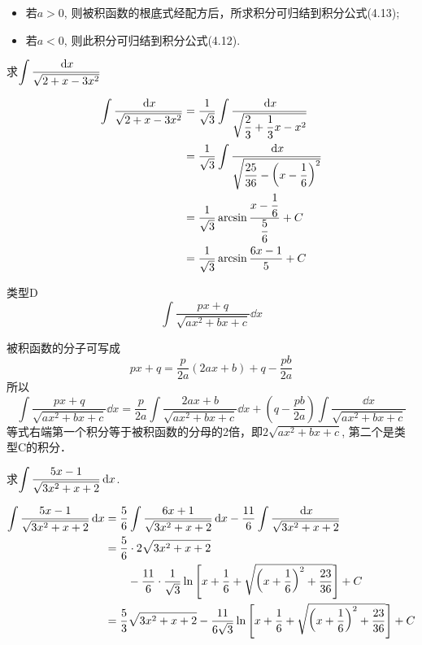 \begin{itemize}
    \item 若$a>0$, 则被积函数的根底式经配方后，所求积分可归结到积分公式(4.13);
    \item  若$a<0$, 则此积分可归结到积分公式(4.12).
\end{itemize}

\begin{example}
    求$\displaystyle\int \dfrac{\,{\rm d} x}{\sqrt{2+x-3x^2}}$
\end{example}

\begin{solution}
    \[\begin{split}
        \displaystyle\int \dfrac{\,{\rm d} x}{\sqrt{2+x-3x^2}}&=\dfrac{1}{\sqrt{3}}\int \dfrac{\,{\rm d} x}{\sqrt{\dfrac{2}{3}+\dfrac{1}{3}x-x^2}}\\
        &=\dfrac{1}{\sqrt{3}}\int \dfrac{\,{\rm d} x}{\sqrt{\dfrac{25}{36}-\left(x-\dfrac{1}{6}\right)^2}}\\
        &=\dfrac{1}{\sqrt{3}}\arcsin\dfrac{x-\dfrac{1}{6}}{\dfrac{5}{6}}+C\\
        &=\dfrac{1}{\sqrt{3}}\arcsin\dfrac{6x-1}{5}+C       
    \end{split}\]
\end{solution}

\begin{blk}{类型D}
\[\int \frac{px+q}{\sqrt{ax^2+bx+c}}\dd x\]
\end{blk}

被积函数的分子可写成
\[px+q=\frac{p}{2a}(2ax+b)+q-\frac{pb}{2a}\]
所以
\[
    \int \frac{px+q}{\sqrt{ax^2+bx+c}}\dd x=\frac{p}{2a}\int \frac{2ax+b}{\sqrt{ax^2+bx+c}}\dd x+\left(q-\frac{pb}{2a}\right)\int\frac{\dd x}{\sqrt{ax^2+bx+c}}
\]
等式右端第一个积分等于被积函数的分母的2倍，即$2\sqrt{ax^2+bx+c}$, 第二个是类型C的积分．

\begin{example}
    求$\displaystyle\int \dfrac{5x-1}{\sqrt{3x^2+x+2}}\,{\rm d} x$.
\end{example}

\begin{solution}
    \[\begin{split}
        \displaystyle\int \dfrac{5x-1}{\sqrt{3x^2+x+2}}\,{\rm d} x&=\dfrac{5}{6}\int \dfrac{6x+1}{\sqrt{3x^2+x+2}}\,{\rm d} x-\dfrac{11}{6}\int \dfrac{\,{\rm d} x}{\sqrt{3x^2+x+2}}\\
&=\dfrac{5}{6}\cdot 2\sqrt{3x^2+x+2}\\
&\qquad -\dfrac{11}{6}\cdot\dfrac{1}{\sqrt{3}}\ln\left[x+\dfrac{1}{6}+\sqrt{\left(x+\dfrac{1}{6}\right)^2+\dfrac{23}{36}}\right]+C\\
&=\dfrac{5}{3}\sqrt{3x^2+x+2}-\dfrac{11}{6\sqrt{3}}\ln\left[x+\dfrac{1}{6}+\sqrt{\left(x+\dfrac{1}{6}\right)^2+\dfrac{23}{36}}\right]+C        
    \end{split}\]
\end{solution}

